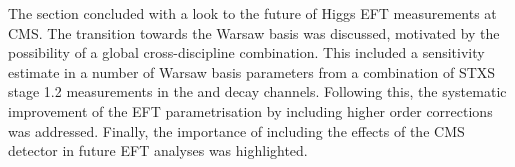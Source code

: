 The section concluded with a look to the future of Higgs EFT measurements at CMS. The transition towards the Warsaw basis was discussed, motivated by the possibility of a global cross-discipline combination. This included a sensitivity estimate in a number of Warsaw basis parameters from a combination of STXS stage 1.2 measurements in the \Hgg and \Hfl decay channels. Following this, the systematic improvement of the EFT parametrisation by including higher order corrections was addressed. Finally, the importance of including the effects of the CMS detector in future EFT analyses was highlighted.
